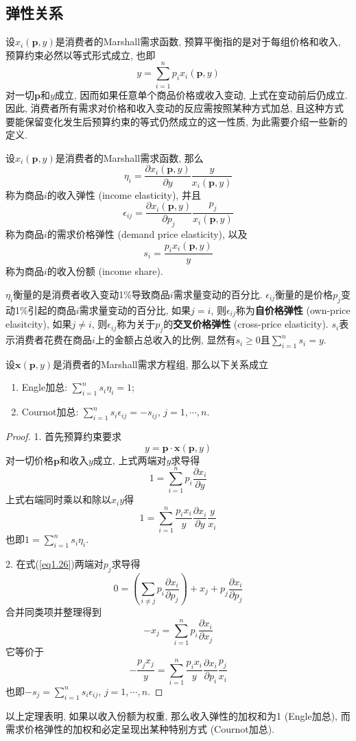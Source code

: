 \documentclass[cn, 12pt, math=mtpro2, bibstyle=apa, blue, twocol]{elegantbook}
\newcommand{\p}{\mathbf{p}}
\newcommand{\x}{\mathbf{x}}
\begin{document}
\subsection{弹性关系}
设$x_i(\p,y)$是消费者的Marshall需求函数, 预算平衡指的是对于每组价格和收入, 预算约束必然以等式形式成立, 也即
$$y=\sum_{i=1}^{n}p_ix_i(\p,y)$$
对一切$\p$和$y$成立, 因而如果任意单个商品价格或收入变动, 上式在变动前后仍成立. 因此, 消费者所有需求对价格和收入变动的反应需按照某种方式加总, 且这种方式要能保留变化发生后预算约束的等式仍然成立的这一性质, 为此需要介绍一些新的定义.

\begin{definition}
设$x_i(\p,y)$是消费者的Marshall需求函数, 那么
$$\eta_i=\frac{\partial x_i(\p,y)}{\partial y}\frac{y}{x_i(\p,y)}$$
称为商品$i$的收入弹性 (income elasticity), 并且
$$\epsilon_{ij}=\frac{\partial x_i(\p,y)}{\partial p_j}\frac{p_j}{x_i(\p,y)}$$
称为商品$i$的需求价格弹性 (demand price elasticity), 以及
$$s_i=\frac{p_ix_i(\p,y)}{y}$$
称为商品$i$的收入份额 (income share).
\end{definition}

$\eta_i$衡量的是消费者收入变动1\%导致商品$i$需求量变动的百分比. $\epsilon_{ij}$衡量的是价格$p_j$变动1\%引起的商品$i$需求量变动的百分比, 如果$j=i$, 则$\epsilon_{ij}$称为\textbf{自价格弹性} (own-price elasitcity), 如果$j\ne i$, 则$\epsilon_{ij}$称为关于$p_j$的\textbf{交叉价格弹性} (cross-price elasticity). $s_i$表示消费者花费在商品$i$上的金额占总收入的比例, 显然有$s_i\ge0$且$\sum_{i=1}^{n}s_i=y$.

\begin{theorem}\label{thm:thm1.8}
  设$\x(\p,y)$是消费者的Marshall需求方程组, 那么以下关系成立
  \begin{enumerate}[label=\arabic*.]
    \item Engle加总: $\sum_{i=1}^{n}s_i\eta_i=1$;
    \item Cournot加总: $\sum_{i=1}^{n}s_i\epsilon_{ij}=-s_{ij}$, $j=1,\cdots,n$.
  \end{enumerate}
\end{theorem}
\begin{proof}
  1. 首先预算约束要求
  \begin{equation}\label{eq1.26}
    y=\p\cdot\x(\p,y)
  \end{equation}
  对一切价格$\p$和收入$y$成立, 上式两端对$y$求导得
  $$1=\sum_{i=1}^{n}p_i\frac{\partial x_i}{\partial y}$$
  上式右端同时乘以和除以$x_iy$得
  $$1=\sum_{i=1}^{n}\frac{p_ix_i}{y}\frac{\partial x_i}{\partial y}\frac{y}{x_i}$$
  也即$1=\sum_{i=1}^{n}s_i\eta_i$.

  2. 在式(\ref{eq1.26})两端对$p_j$求导得
  $$0=\left(\sum_{i\ne j}p_i\frac{\partial x_i}{\partial p_j}\right)+x_j+p_j\frac{\partial x_i}{\partial p_j}$$
  合并同类项并整理得到
  $$-x_j=\sum_{i=1}^{n}p_i\frac{\partial x_i}{\partial x_j}$$
  它等价于
  $$-\frac{p_jx_j}{y}=\sum_{i=1}^{n}\frac{p_ix_i}{y}\frac{\partial x_i}{\partial p_i}\frac{p_j}{x_i}$$
  也即$-s_j=\sum_{i=1}^{n}s_i\epsilon_{ij}$, $j=1,\cdots,n$.
\end{proof}
以上定理表明, 如果以收入份额为权重, 那么收入弹性的加权和为1 (Engle加总), 而需求价格弹性的加权和必定呈现出某种特别方式 (Cournot加总).
\end{document}
